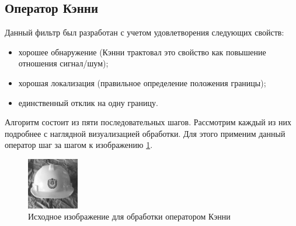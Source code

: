 \subsection{Оператор Кэнни}

Данный фильтр\cite{Canny} был разработан с учетом удовлетворения следующих свойств:
\begin{itemize}
	\item хорошее обнаружение (Кэнни трактовал это свойство как повышение отношения сигнал/шум);
	\item хорошая локализация (правильное определение положения границы);
	\item единственный отклик на одну границу.
\end{itemize}

Алгоритм состоит из пяти последовательных шагов. Рассмотрим каждый из них подробнее с наглядной визуализацией обработки. Для этого применим данный оператор шаг за шагом к изображению \ref{fig:canny_orig}.

\begin{figure}[!h]
	\centering
	\includegraphics[width=0.2\textwidth,keepaspectratio]{figures/ru/bmstu_gray}
	\caption{Исходное изображение для обработки оператором Кэнни}
	\label{fig:canny_orig}
\end{figure}

